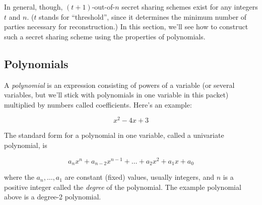 \documentclass[12 pt]{article}
\newcounter{example}[section]
\begin{document}
In general, though, $(t+1)$-out-of-$n$ secret sharing schemes exist for any integers
$t$ and $n$.
($t$ stands for ``threshold'', since it determines the minimum number of parties necessary 
for reconstruction.)
In this section, we'll see how to construct such a secret sharing scheme using the properties 
of polynomials.

\subsection{Polynomials}

A \emph{polynomial} is an expression consisting of powers of a variable (or several variables,
but we'll stick with polynomials in one variable in this packet) multiplied by numbers called 
coefficients. Here's an example:

\[
    x^2 - 4x + 3
\]

The standard form for a polynomial in one variable, called a univariate polynomial, is 

\begin{equation}\label{eqn:std-form}
    a_n x^n + a_{n-2} x^{n-1} + \ldots + a_2 x^2 + a_1 x + a_0
\end{equation}

where the $a_n, \ldots, a_1$ are constant (fixed) values, usually integers, and $n$ 
is a positive integer called the \emph{degree} of the polynomial. The example polynomial
above is a degree-2 polynomial.

\begin{center}
\end{center}
\end{document}
